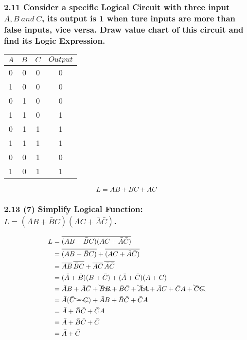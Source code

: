     \subsubsection{2.11 \textnormal{Consider a specific Logical Circuit with three input $A,B~and~C$, its output is 1 when ture inputs are more than false inputs, vice versa. Draw value chart of this circuit and find its Logic Expression}.}
    {\color{hwSolution}
        \begin{center}
            \begin{tabular}{c c c|c}
                $A$ & $B$ & $C$ & $Output$ \\
                \hline
                0   & 0   & 0   & 0 \\
                1   & 0   & 0   & 0 \\
                0   & 1   & 0   & 0 \\
                1   & 1   & 0   & 1 \\
                0   & 1   & 1   & 1 \\
                1   & 1   & 1   & 1 \\
                0   & 0   & 1   & 0 \\
                1   & 0   & 1   & 1 \\
            \end{tabular}
            \[L = AB + BC + AC\]
        \end{center}
    }
    \subsubsection{2.13 (7) \textnormal{Simplify Logical Function: $L=\overline{(AB+\bar{B}C)(AC+\bar{A}\bar{C})}$}.}
    {\color{hwSolution}
        \begin{align*}
            L
            &= \overline{(AB+\bar{B}C)(AC+\bar{A}\bar{C})}\\
            &= \overline{(AB+\bar{B}C)}+\overline{(AC+\bar{A}\bar{C})}\\
            &= \overline{AB}\,\overline{\bar{B}C}+\overline{AC}\,\overline{\bar{A}\bar{C}}\\
            &= (\bar{A}+\bar{B})(B+\bar{C}) + (\bar{A}+\bar{C})(A+C)\\
            &= \bar{A}B+\bar{A}\bar{C}+\bcancel{\bar{B}B}+\bar{B}\bar{C}+\bcancel{\bar{A}A}+\bar{A}C+\bar{C}A+\bcancel{\bar{C}C}\\
            &= \bar{A}(\bcancel{\bar{C}+C})+\bar{A}B+\bar{B}\bar{C}+\bar{C}A\\
            &= \bar{A}+\bar{B}\bar{C}+\bar{C}A\\
            &= \bar{A}+\bar{B}\bar{C}+\bar{C}\\
            &= \bar{A}+\bar{C}
        \end{align*}
    }
